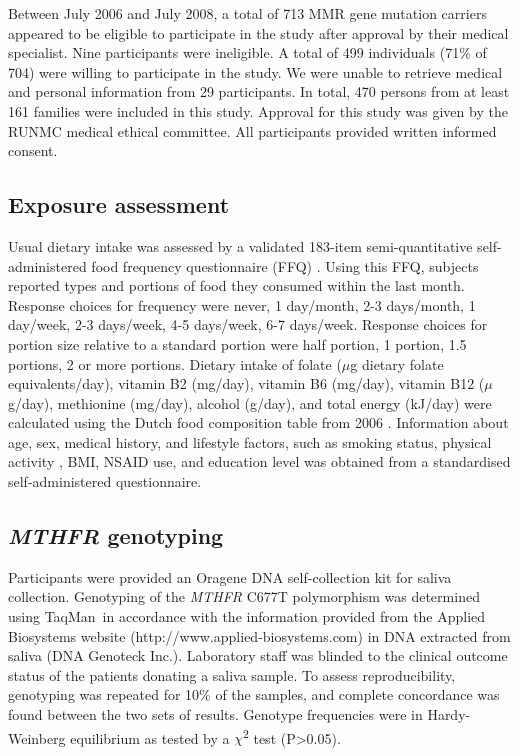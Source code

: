 \noindent Between July 2006 and July 2008, a total of 713 MMR gene mutation carriers appeared to be eligible to participate in the study after approval by their medical specialist. Nine participants were ineligible. A total of 499 individuals (71\% of 704) were willing to participate in the study. We were unable to retrieve medical and personal information from 29 participants. In total, 470 persons from at least 161 families were included in this study. Approval for this study was given by the RUNMC medical ethical committee. All participants provided written informed consent.

\subsection{Exposure assessment} %
\noindent Usual dietary intake was assessed by a validated 183-item semi-quantitative self-administered food frequency questionnaire (FFQ) \cite{c628,c629}. Using this FFQ, subjects reported types and portions of food they consumed within the last month. Response choices for frequency were never, 1 day/month, 2-3 days/month, 1 day/week, 2-3 days/week, 4-5 days/week, 6-7 days/week. Response choices for portion size relative to a standard portion were half portion, 1 portion, 1.5 portions, 2 or more portions. Dietary intake of folate ($\mu$g dietary folate equivalents/day), vitamin B2 (mg/day), vitamin B6 (mg/day), vitamin B12 ($\mu$g/day), methionine (mg/day), alcohol (g/day), and total energy (kJ/day) were calculated using the Dutch food composition table from 2006 \cite{c630}. Information about age, sex, medical history, and lifestyle factors, such as smoking status, physical activity \cite{c631}, BMI, NSAID use, and education level was obtained from a standardised self-administered questionnaire.

\subsection{\emph{MTHFR} genotyping} %
\noindent Participants were provided an Oragene DNA self-collection kit for saliva collection. Genotyping of the \emph{MTHFR} C677T polymorphism was determined using TaqMan\textsuperscript{\textregistered}~in accordance with the information provided from the Applied Biosystems website (http://www.applied-biosystems.com) in DNA extracted from saliva (DNA Genoteck Inc.). Laboratory staff was blinded to the clinical outcome status of the patients donating a saliva sample. To assess reproducibility, genotyping was repeated for 10\% of the samples, and complete concordance was found between the two sets of results. Genotype frequencies were in Hardy-Weinberg equilibrium as tested by a $\chi$\textsuperscript{2} test (P>0.05).

